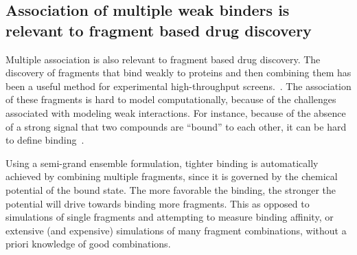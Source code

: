 \documentclass[10pt,final]{article}
\begin{document}
\subsection*{Association of multiple weak binders is relevant to fragment based drug discovery}
Multiple association is also relevant to fragment based drug discovery.  %
The discovery of fragments that bind weakly to proteins and then combining them has been a useful method for experimental high-throughput screens.~\cite{Hajduk2007a}. %
The association of these fragments is hard to model computationally, because of the challenges associated with modeling weak interactions. 
For instance, because of the absence of a strong signal that two compounds are ``bound'' to each other, it can be hard to define binding~\cite{Gilson1997a}. 

Using a semi-grand ensemble formulation, tighter binding is automatically achieved by combining multiple fragments, since it is governed by the chemical potential of the bound state. %
The more favorable the binding, the stronger the potential will drive towards binding more fragments. This as opposed to simulations of single fragments and attempting to measure binding affinity, or extensive (and expensive) simulations of many fragment combinations, without a priori knowledge of good combinations. 


\end{document}
